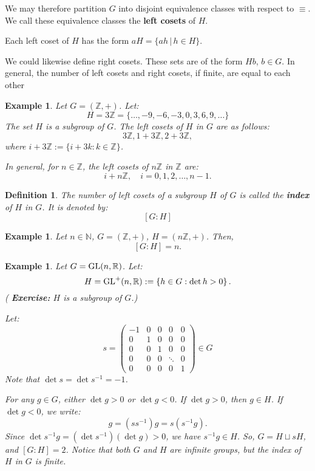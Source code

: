 \documentclass[a4paper,12pt]{report}
\newcounter{statement}
\numberwithin{statement}{chapter}
\newtheorem{defn}[statement]{Definition}
\newtheorem{eg}[statement]{\bf Example}
\numberwithin{equation}{chapter}
\numberwithin{section}{chapter}
\numberwithin{subsection}{section}
\begin{document}
We may therefore partition $G$
into disjoint equivalence classes with respect to $\equiv$.
We call these equivalence classes the  {\bf left cosets}  of $H$.



Each left coset of $H$ has the form $aH = \{ah \,|\, h \in H\}$.




We could likewise define  right cosets.  These sets are of the form $Hb$, $b \in G$.
In general,
the number of left cosets and right cosets, if finite, are equal to each other


\begin{eg}
Let $G = (\mathbb{Z}, +)$.
Let:
\[
H = 3\mathbb{Z} =
\{\ldots, -9, -6, -3, 0, 3, 6, 9, \ldots\}
\]
The set $H$ is a subgroup of $G$.
The left cosets of $H$ in $G$ are as follows:
\[
3\mathbb{Z}, 1 + 3\mathbb{Z}, 2 + 3\mathbb{Z},
\]
where $i + 3\mathbb{Z} := \{i + 3k : k \in \mathbb{Z}\}$.



In general, for $n \in \mathbb{Z}$,
the left cosets of $n\mathbb{Z}$ in $\mathbb{Z}$ are:
\[
i + n\mathbb{Z}, \quad i = 0, 1, 2, \ldots, n - 1.
\]
\end{eg}

\begin{defn}
The number of left cosets of a subgroup $H$ of $G$ is called the  {\bf index}  of $H$ in $G$.
It is denoted by:
\[
[G : H]
\]
\end{defn}
\begin{eg}
Let $n \in \mathbb{N}$,
$G = (\mathbb{Z}, +)$, $H = (n\mathbb{Z}, +)$.
Then,
\[
[G:H] = n.
\]
\end{eg}

\begin{eg}
Let $G = {\rm GL}(n, \mathbb{R})$.  Let:
\[
H = {\rm GL}^+(n, \mathbb{R}) := \left\{ h \in G : \det h > 0\right\}.
\]
( {\bf Exercise:}  $H$ is a subgroup of $G$.)



Let:
\[
s = \left(
\begin{matrix}
-1 & 0 & 0& 0 & 0\\
0&1 &0 &0 &0\\
0&0 &1 &0 &0\\
0&0 &0 &\ddots&0\\
0& 0 &0 &0 &1
\end{matrix}
\right) \in G
\]
Note that $\det s = \det s^{-1} = -1$.



For any $g \in G$, either $\det g > 0$ or $\det g < 0$.
If $\det g > 0$, then $g \in H$.
If $\det g < 0$, we write:
\[
g = (ss^{-1}) g = s(s^{-1} g).
\]
Since $\det s^{-1}g = (\det s^{-1})(\det g) > 0$, we have $s^{-1}g \in H$.
So, $G = H \sqcup s H$, and $[G : H] = 2$.
Notice that both $G$ and $H$ are infinite groups, but the index of $H$ in $G$ is finite.
\end{eg}
\end{document}
